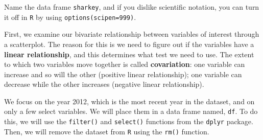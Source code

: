 \documentclass[
]{book}
\newenvironment{Shaded}{\begin{snugshade}}{\end{snugshade}}
\newcommand{\CommentTok}[1]{\textcolor[rgb]{0.56,0.35,0.01}{\textit{#1}}}
\newcommand{\FunctionTok}[1]{\textcolor[rgb]{0.00,0.00,0.00}{#1}}
\newcommand{\NormalTok}[1]{#1}
\newcommand{\OtherTok}[1]{\textcolor[rgb]{0.56,0.35,0.01}{#1}}
\newcommand{\SpecialCharTok}[1]{\textcolor[rgb]{0.00,0.00,0.00}{#1}}
\newcommand{\StringTok}[1]{\textcolor[rgb]{0.31,0.60,0.02}{#1}}
\begin{document}
Name the data frame \texttt{sharkey}, and if you dislike scientific notation, you can turn it off in \texttt{R} by using \texttt{options(scipen=999)}.

First, we examine our bivariate relationship between variables of interest through a scatterplot. The reason for this is we need to figure out if the variables have a \textbf{linear relationship}, and this determines what test we need to use. The extent to which two variables move together is called \textbf{covariation}: one variable can increase and so will the other (positive linear relationship); one variable can decrease while the other increases (negative linear relationship).

We focus on the year 2012, which is the most recent year in the dataset, and on only a few select variables. We will place them in a data frame named, \texttt{df}. To do this, we will use the \texttt{filter()} and \texttt{select()} functions from the \texttt{dplyr} package. Then, we will remove the dataset from \texttt{R} using the \texttt{rm()} function.

\begin{Shaded}
\end{Shaded}
\end{document}
